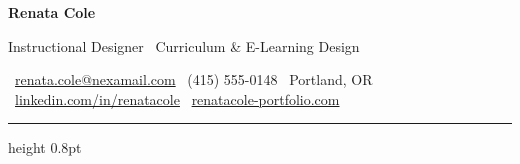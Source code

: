 \documentclass[10pt]{article}
\begin{document}
\begin{center}
  {\color{darktext}\fontsize{24}{26}\selectfont\bfseries Renata Cole}\par
  \vspace{2pt}
  {\color{accent}\fontsize{12}{14}\selectfont Instructional Designer \textbar\ Curriculum \& E-Learning Design}\par
  \vspace{4pt}
  {\color{graytext}\small
    \faEnvelope\ \href{mailto:renata.cole@nexamail.com}{renata.cole@nexamail.com} \quad\textbar\quad
    \faPhone\ (415) 555-0148 \quad\textbar\quad
    \faMapMarker\ Portland, OR \quad\textbar\quad
    \faLinkedin\ \href{https://linkedin.com/in/renatacole}{linkedin.com/in/renatacole} \quad\textbar\quad
    \faGlobe\ \href{https://renatacole-portfolio.com}{renatacole-portfolio.com}
  }
\end{center}
\vspace{6pt}
{\color{rulegray}\hrule height 0.8pt}
\vspace{8pt}
\end{document}
